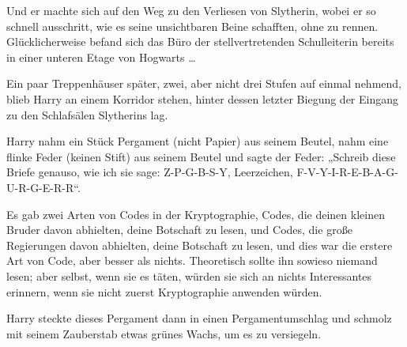 Und er machte sich auf den Weg zu den Verliesen von Slytherin, wobei er so schnell ausschritt, wie es seine unsichtbaren Beine schafften, ohne zu rennen. Glücklicherweise befand sich das Büro der stellvertretenden Schulleiterin bereits in einer unteren Etage von Hogwarts …

Ein paar Treppenhäuser später, zwei, aber nicht drei Stufen auf einmal nehmend, blieb Harry an einem Korridor stehen, hinter dessen letzter Biegung der Eingang zu den Schlafsälen Slytherins lag.

Harry nahm ein Stück Pergament (nicht Papier) aus seinem Beutel, nahm eine flinke Feder (keinen Stift) aus seinem Beutel und sagte der Feder:
„Schreib diese Briefe genauso, wie ich sie sage: Z-P-G-B-S-Y, Leerzeichen, F-V-Y-I-R-E-B-A-G-U-R-G-E-R-R“.

Es gab zwei Arten von Codes in der Kryptographie, Codes, die deinen kleinen Bruder davon abhielten, deine Botschaft zu lesen, und Codes, die große Regierungen davon abhielten, deine Botschaft zu lesen, und dies war die erstere Art von Code, aber besser als nichts. Theoretisch sollte ihn sowieso niemand lesen; aber selbst, wenn sie es täten, würden sie sich an nichts Interessantes erinnern, wenn sie nicht zuerst Kryptographie anwenden würden.

Harry steckte dieses Pergament dann in einen Pergamentumschlag und schmolz mit seinem Zauberstab etwas grünes Wachs, um es zu versiegeln.

